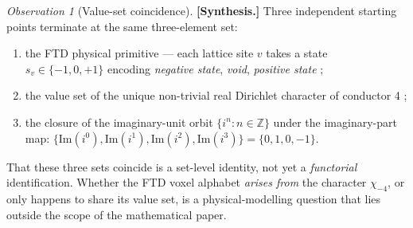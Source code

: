\documentclass[11pt]{amsart}
\theoremstyle{plain}
\theoremstyle{definition}
\theoremstyle{remark}
\newtheorem*{observation}{Observation}
\newcommand{\Z}{\mathbb{Z}}
\begin{document}
\begin{observation}[Value-set coincidence]\label{obs:value-set-coincidence}
\textbf{[Synthesis.]} Three independent starting points terminate at the
same three-element set:
\begin{enumerate}[label=\textup{(\arabic*)}, leftmargin=*, itemsep=2pt]
\item the FTD physical primitive --- each lattice site $v$ takes a state
$s_v \in \{-1, 0, +1\}$ encoding \emph{negative state}, \emph{void},
\emph{positive state} \cite{ftd-spec};
\item the value set of the unique non-trivial real Dirichlet character of
conductor 4 \cite[\S 16]{paper-gstar-A};
\item the closure of the imaginary-unit orbit $\{i^{n} : n \in \Z\}$
under the imaginary-part map: $\{\mathrm{Im}(i^{0}), \mathrm{Im}(i^{1}),
\mathrm{Im}(i^{2}), \mathrm{Im}(i^{3})\} = \{0, 1, 0, -1\}$.
\end{enumerate}
That these three sets coincide is a set-level identity, not yet a
\emph{functorial} identification. Whether the FTD voxel alphabet
\emph{arises from} the character $\chi_{-4}$, or only happens to share
its value set, is a physical-modelling question that lies outside the
scope of the mathematical paper.
\end{observation}
\end{document}
